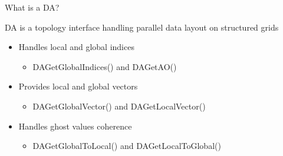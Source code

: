 \begin{frame}{What is a DA?}

{\kb DA} is a topology interface handling parallel data layout on structured grids

\begin{itemize}
  \item Handles local and global indices
  \begin{itemize}
    \item {\kb DAGetGlobalIndices()} and {\kb DAGetAO()}
  \end{itemize}

  \item Provides local and global vectors
  \begin{itemize}
    \item {\kb DAGetGlobalVector()} and {\kb DAGetLocalVector()}
  \end{itemize}

  \item Handles ghost values coherence
  \begin{itemize}
    \item {\kb DAGetGlobalToLocal()} and {\kb DAGetLocalToGlobal()}
  \end{itemize}
\end{itemize}

\end{frame}
